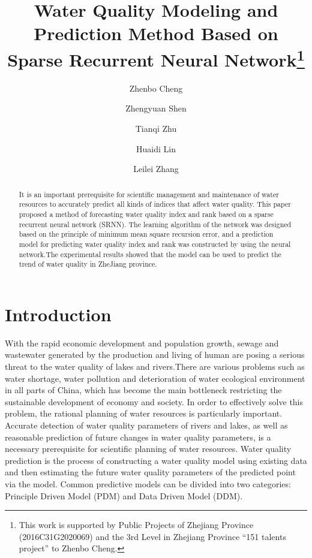 \documentclass[runningheads]{llncs}
\begin{document}
%
\title{Water Quality Modeling and Prediction Method Based on Sparse Recurrent Neural Network\thanks{This work is supported by Public Projects of Zhejiang Province (2016C31G2020069) and the 3rd Level in Zhejiang Province “151 talents project” to Zhenbo Cheng.}}
%
%
\author{Zhenbo Cheng\inst{} \and
Zhengyuan Shen\inst{} \and
Tianqi Zhu\inst{}\and
Huaidi Lin\inst{}\and
Leilei Zhang\inst{}}
%
%
%
\maketitle              %
%
\begin{abstract}
It is an important prerequisite for scientific management and maintenance of water 
resources to accurately predict all kinds of indices that affect water quality. 
This paper proposed a method of forecasting water quality index and rank based on a sparse 
recurrent neural network (SRNN). The learning algorithm of the network was designed 
based on the principle of minimum mean square recursion error, and a 
prediction model for predicting water quality index and rank was 
constructed by using the neural network.The experimental results 
showed that the model can be used to predict the trend of water quality 
in ZheJiang province.


\end{abstract}
%
%
%

\section{Introduction}
With the rapid economic development and population growth, 
sewage and wastewater generated by the production and living of 
human are posing a serious threat to the water quality of lakes and 
rivers\cite{RN1}.There are various problems such as water shortage, water 
pollution and deterioration of water ecological environment in all 
parts of China\cite{RN1}, which has become the main bottleneck restricting the 
sustainable development of economy and society. In order to effectively 
solve this problem, the rational planning 
of water resources is particularly important\cite{RN2,RN3}. Accurate detection of water 
quality parameters of rivers and lakes, as well as reasonable prediction
of future changes in water quality parameters\cite{RN4}, is a necessary 
prerequisite for scientific planning of water resources. Water quality 
prediction is the process of constructing a water quality model using 
existing data and then estimating the future water quality parameters of 
the predicted point via the model. Common predictive models can be divided 
into two categories: Principle Driven Model (PDM) and Data Driven Model (DDM).
\end{document}
